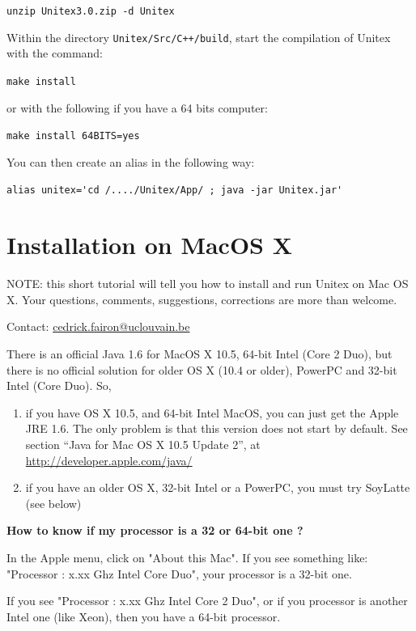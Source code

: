 \bigskip \noindent \verb$unzip Unitex3.0.zip -d Unitex$

\bigskip
\noindent Within the directory \verb|Unitex/Src/C++/build|, start the compilation
of Unitex with the command:

\bigskip \verb+make install+

\bigskip
\noindent or with the following if you have a 64 bits computer:
 
\bigskip \verb+make install 64BITS=yes+

\bigskip
\noindent You can then create an alias in the following way:

\bigskip \verb$alias unitex='cd /..../Unitex/App/ ; java -jar Unitex.jar'$


\section{Installation on MacOS X}
\label{section-macos-install}
\noindent NOTE: this short tutorial will tell you how to install and run 
Unitex on Mac OS X. Your questions, comments, suggestions, 
corrections are more than welcome. 

\noindent Contact: \url{cedrick.fairon@uclouvain.be}

\bigskip
\noindent There is an official Java 1.6 for MacOS X 10.5, 64-bit Intel 
(Core 2 Duo), but there is no official solution for older OS X (10.4 or older),
PowerPC and 32-bit Intel (Core Duo). So,
\begin{enumerate}
    \item if you have OS X 10.5, and 64-bit Intel MacOS, you can just get the
    Apple JRE 1.6. The only problem is that this version does not start by
    default. See section ``Java for Mac OS X 10.5 Update 2'', 
    at \url{http://developer.apple.com/java/}

    \item if you have an older OS X, 32-bit Intel or a PowerPC, you must try
    SoyLatte (see below)
\end{enumerate}

\noindent\textbf{How to know if my processor is a 32 or 64-bit one ?}

\noindent In the Apple menu, click on "About this Mac". If you see something
like: "Processor : x.xx Ghz Intel Core Duo", your processor is a 32-bit one.

\bigskip
\noindent If you see "Processor : x.xx Ghz Intel Core 2 Duo", or if you
processor is another Intel one (like Xeon), then you have a 64-bit processor.

